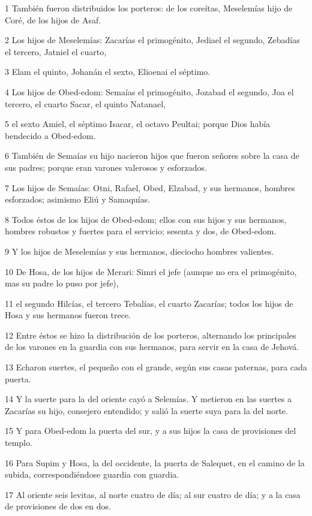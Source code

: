 \par 1 También fueron distribuidos los porteros: de los coreítas, Meselemías hijo de Coré, de los hijos de Asaf.
\par 2 Los hijos de Meselemías: Zacarías el primogénito, Jediael el segundo, Zebadías el tercero, Jatniel el cuarto,
\par 3 Elam el quinto, Johanán el sexto, Elioenai el séptimo.
\par 4 Los hijos de Obed-edom: Semaías el primogénito, Jozabad el segundo, Joa el tercero, el cuarto Sacar, el quinto Natanael,
\par 5 el sexto Amiel, el séptimo Isacar, el octavo Peultai; porque Dios había bendecido a Obed-edom. 
\par 6 También de Semaías su hijo nacieron hijos que fueron señores sobre la casa de sus padres; porque eran varones valerosos y esforzados.
\par 7 Los hijos de Semaías: Otni, Rafael, Obed, Elzabad, y sus hermanos, hombres esforzados; asimismo Eliú y Samaquías.
\par 8 Todos éstos de los hijos de Obed-edom; ellos con sus hijos y sus hermanos, hombres robustos y fuertes para el servicio; sesenta y dos, de Obed-edom.
\par 9 Y los hijos de Meselemías y sus hermanos, dieciocho hombres valientes.
\par 10 De Hosa, de los hijos de Merari: Simri el jefe (aunque no era el primogénito, mas su padre lo puso por jefe),
\par 11 el segundo Hilcías, el tercero Tebalías, el cuarto Zacarías; todos los hijos de Hosa y sus hermanos fueron trece.
\par 12 Entre éstos se hizo la distribución de los porteros, alternando los principales de los varones en la guardia con sus hermanos, para servir en la casa de Jehová.
\par 13 Echaron suertes, el pequeño con el grande, según sus casas paternas, para cada puerta.
\par 14 Y la suerte para la del oriente cayó a Selemías. Y metieron en las suertes a Zacarías su hijo, consejero entendido; y salió la suerte suya para la del norte.
\par 15 Y para Obed-edom la puerta del sur, y a sus hijos la casa de provisiones del templo.
\par 16 Para Supim y Hosa, la del occidente, la puerta de Salequet, en el camino de la subida, correspondiéndose guardia con guardia.
\par 17 Al oriente seis levitas, al norte cuatro de día; al sur cuatro de día; y a la casa de provisiones de dos en dos.
